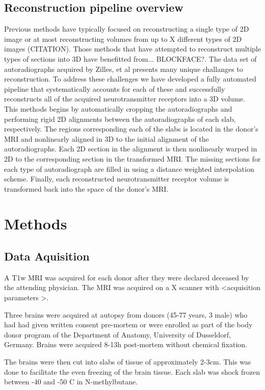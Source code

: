 \documentclass[12pt]{article}
\begin{document}
\subsection{Reconstruction pipeline overview}
Previous methods have typically focused on reconstructing a single type of 2D image or at most reconstructing volumes from up to X different types of 2D images (CITATION). Those methods that have attempted to reconstruct multiple types of sections into 3D have benefitted from... BLOCKFACE?. The data set of autoradiographs acquired by Zilles, et al \cite{Zilles2004} presents many unique challanges to reconstruction. To address these challenges we have developed a fully automated pipeline that systematically accounts for each of these and successfully reconstructs all of the acquired neurotransmitter receptors into a 3D volume. This methods begins by automatically cropping the autoradiographs and performing rigid 2D alignments between the autoradiographs of each slab, respectively. The regions corresponding each of the slabs is located in the donor's MRI and nonlinearly aligned in 3D to the initial alignment of the autoradiographs. Each 2D section in the alignment is then nonlinearly warped in 2D to the corresponding section in the transformed MRI. The missing sections for each type of autoradiograph are filled in using a distance weighted interpolation scheme. Finally, each reconstructed neurotransmitter receptor volume is transformed back into the space of the donor's MRI.

\section{Methods}
\subsection{Data Aquisition} 

A T1w MRI was acquired for each donor after they were declared deceased by the attending physician. The MRI was acquired on a X scanner with <acquisition parameters >. 

Three brains were acquired at autopsy from donors (45-77 years, 3 male) who had had given written consent pre-mortem or were enrolled as part of the body donor program of the Department of Anatomy, University of Dusseldorf, Germany. Brains were acquired 8-13h post-mortem without chemical fixation.

The brains were then cut into slabs of tissue of approximately 2-3cm. This was done to facilitate the even freezing of the brain tissue. Each slab was shock frozen between -40 and -50 C in N-methylbutane. 
\end{document}
